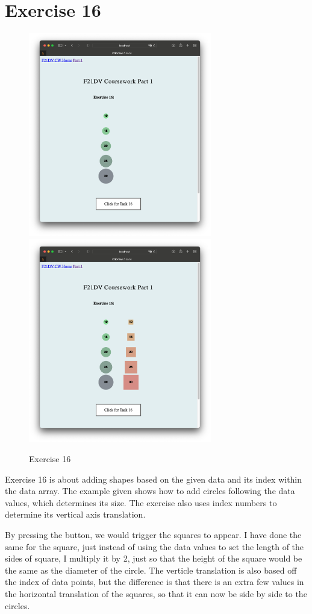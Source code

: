 \documentclass{scrreprt}
\begin{document}
\newpage
\section{Exercise 16}
\begin{figure}[!ht]
    \centering
    \includegraphics[width = 8cm]{images/ex16_1.png}
    \includegraphics[width = 8cm]{images/ex16_2.png}
    \label{fig:ex16}
    \caption{Exercise 16}
\end{figure}
\FloatBarrier
% 
Exercise 16 is about adding shapes based on the given data and its index within the data array. The 
example given shows how to add circles following the data values, which determines its size. The 
exercise also uses index numbers to determine its vertical axis translation. \\
\par By pressing the button, we would trigger the squares to appear. I have done the same
for the square, just instead of using the data values to set the length of the sides of square, I
multiply it by 2, just so that the height of the square would be the same as the diameter of the 
circle. The verticle translation is also based off the index of data points, but the difference is
that there is an extra few values in the horizontal translation of the squares, so that it can now 
be side by side to the circles. 
\end{document}

